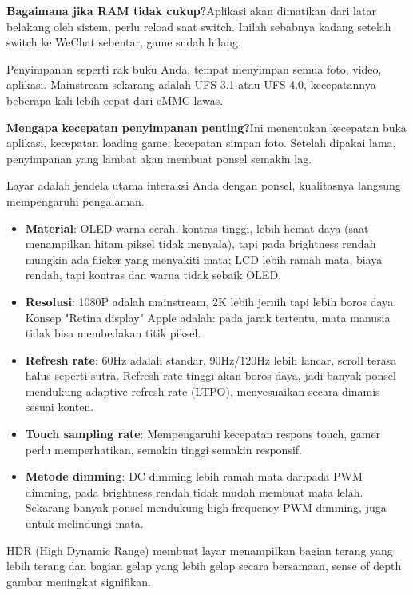 \textbf{Bagaimana jika RAM tidak cukup?}Aplikasi akan dimatikan dari latar belakang oleh sistem, perlu reload saat switch. Inilah sebabnya kadang setelah switch ke WeChat sebentar, game sudah hilang.


Penyimpanan seperti rak buku Anda, tempat menyimpan semua foto, video, aplikasi. Mainstream sekarang adalah UFS 3.1 atau UFS 4.0, kecepatannya beberapa kali lebih cepat dari eMMC lawas.

\textbf{Mengapa kecepatan penyimpanan penting?}Ini menentukan kecepatan buka aplikasi, kecepatan loading game, kecepatan simpan foto. Setelah dipakai lama, penyimpanan yang lambat akan membuat ponsel semakin lag.


Layar adalah jendela utama interaksi Anda dengan ponsel, kualitasnya langsung mempengaruhi pengalaman.

\begin{itemize}
  \item \textbf{Material}: OLED warna cerah, kontras tinggi, lebih hemat daya (saat menampilkan hitam piksel tidak menyala), tapi pada brightness rendah mungkin ada flicker yang menyakiti mata; LCD lebih ramah mata, biaya rendah, tapi kontras dan warna tidak sebaik OLED.
  \item \textbf{Resolusi}: 1080P adalah mainstream, 2K lebih jernih tapi lebih boros daya. Konsep "Retina display" Apple adalah: pada jarak tertentu, mata manusia tidak bisa membedakan titik piksel.
  \item \textbf{Refresh rate}: 60Hz adalah standar, 90Hz/120Hz lebih lancar, scroll terasa halus seperti sutra. Refresh rate tinggi akan boros daya, jadi banyak ponsel mendukung adaptive refresh rate (LTPO), menyesuaikan secara dinamis sesuai konten.
  \item \textbf{Touch sampling rate}: Mempengaruhi kecepatan respons touch, gamer perlu memperhatikan, semakin tinggi semakin responsif.
  \item \textbf{Metode dimming}: DC dimming lebih ramah mata daripada PWM dimming, pada brightness rendah tidak mudah membuat mata lelah. Sekarang banyak ponsel mendukung high-frequency PWM dimming, juga untuk melindungi mata.
\end{itemize}


HDR (High Dynamic Range) membuat layar menampilkan bagian terang yang lebih terang dan bagian gelap yang lebih gelap secara bersamaan, sense of depth gambar meningkat signifikan.

